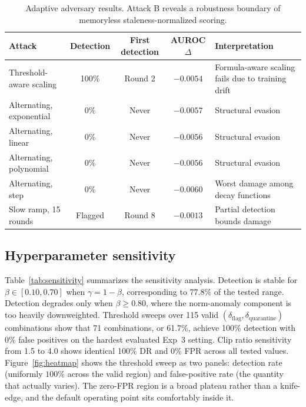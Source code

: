 \documentclass[pdflatex,sn-mathphys-num]{sn-jnl}
\begin{document}
\begin{table}[t]
\caption{Adaptive adversary results. Attack B reveals a robustness boundary of memoryless staleness-normalized scoring.}
\label{tab:adaptive}
\centering
\begin{tabularx}{\textwidth}{@{}lccc>{\raggedright\arraybackslash}X@{}}
\toprule
Attack & Detection & First detection & AUROC $\Delta$ & Interpretation \\
\midrule
Threshold-aware scaling & 100\% & Round 2 & $-0.0054$ & Formula-aware scaling fails due to training drift \\
Alternating, exponential & 0\% & Never & $-0.0057$ & Structural evasion \\
Alternating, linear & 0\% & Never & $-0.0056$ & Structural evasion \\
Alternating, polynomial & 0\% & Never & $-0.0056$ & Structural evasion \\
Alternating, step & 0\% & Never & $-0.0060$ & Worst damage among decay functions \\
Slow ramp, 15 rounds & Flagged & Round 8 & $-0.0013$ & Partial detection bounds damage \\
\bottomrule
\end{tabularx}
\end{table}

\subsection{Hyperparameter sensitivity}

Table~\ref{tab:sensitivity} summarizes the sensitivity analysis. Detection is stable for $\beta\in[0.10,0.70]$ when $\gamma=1-\beta$, corresponding to 77.8\% of the tested range. Detection degrades only when $\beta\geq0.80$, where the norm-anomaly component is too heavily downweighted. Threshold sweeps over 115 valid $(\delta_{\mathrm{flag}},\delta_{\mathrm{quarantine}})$ combinations show that 71 combinations, or 61.7\%, achieve 100\% detection with 0\% false positives on the hardest evaluated Exp~3 setting. Clip ratio sensitivity from 1.5 to 4.0 shows identical 100\% DR and 0\% FPR across all tested values. Figure~\ref{fig:heatmap} shows the threshold sweep as two panels: detection rate (uniformly $100\%$ across the valid region) and false-positive rate (the quantity that actually varies). The zero-FPR region is a broad plateau rather than a knife-edge, and the default operating point sits comfortably inside it.
\end{document}
